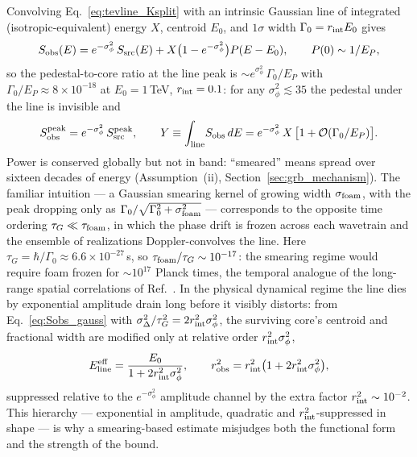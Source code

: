 \documentclass[aps,prd,onecolumn,amsmath,amssymb]{revtex4-2}
\begin{document}
Convolving Eq.~\eqref{eq:tevline_Ksplit} with an intrinsic Gaussian
line of integrated (isotropic-equivalent) energy $X$, centroid $E_0$,
and $1\sigma$ width $\Gamma_0=r_{\rm int}E_0$ gives
\begin{equation}
  S_{\rm obs}(E)
  = e^{-\sigma_\phi^2}\,S_{\rm src}(E)
  + X\bigl(1-e^{-\sigma_\phi^2}\bigr)P(E-E_0),
  \qquad P(0)\sim 1/E_P,
  \label{eq:tevline_conv}
\end{equation}
so the pedestal-to-core ratio at the line peak is
$\sim e^{\sigma_\phi^2}\,\Gamma_0/E_P$ with
$\Gamma_0/E_P\approx 8\times10^{-18}$ at $E_0=1$\,TeV,
$r_{\rm int}=0.1$: for any $\sigma_\phi^2\lesssim 35$ the pedestal
under the line is invisible and
\begin{equation}
  S^{\rm peak}_{\rm obs} = e^{-\sigma_\phi^2}\,S^{\rm peak}_{\rm src},
  \qquad
  Y \equiv \int_{\rm line}\! S_{\rm obs}\,dE
    = e^{-\sigma_\phi^2}\,X\,\bigl[1+\mathcal{O}(\Gamma_0/E_P)\bigr].
  \label{eq:tevline_suppression}
\end{equation}
Power is conserved globally but not in band: ``smeared'' means spread
over sixteen decades of energy (Assumption~(ii),
Section~\ref{sec:grb_mechanism}).  The familiar intuition --- a
Gaussian smearing kernel of growing width $\sigma_{\rm foam}$, with
the peak dropping only as
$\Gamma_0/\sqrt{\Gamma_0^2+\sigma_{\rm foam}^2}$ --- corresponds to
the opposite time ordering $\tau_G\ll\tau_{\rm foam}$, in which the
phase drift is frozen across each wavetrain and the ensemble of
realizations Doppler-convolves the line.  Here
$\tau_G=\hbar/\Gamma_0\approx 6.6\times10^{-27}$\,s, so
$\tau_{\rm foam}/\tau_G\sim10^{-17}$: the smearing regime would
require foam frozen for $\sim10^{17}$ Planck times, the temporal
analogue of the long-range spatial correlations of
Ref.~\cite{LeeZurekChen2024}.  In the physical dynamical regime the
line dies by exponential amplitude drain long before it visibly
distorts: from Eq.~\eqref{eq:Sobs_gauss} with
$\sigma_\Delta^2/\tau_G^2 = 2r_{\rm int}^2\sigma_\phi^2$, the
surviving core's centroid and fractional width are modified only at
relative order $r_{\rm int}^2\sigma_\phi^2$,
\begin{equation}
  E^{\rm eff}_{\rm line} = \frac{E_0}{1+2r_{\rm int}^2\sigma_\phi^2},
  \qquad
  r_{\rm obs}^2 = r_{\rm int}^2\bigl(1+2r_{\rm int}^2\sigma_\phi^2\bigr),
  \label{eq:tevline_shape}
\end{equation}
suppressed relative to the $e^{-\sigma_\phi^2}$ amplitude channel by
the extra factor $r_{\rm int}^2\sim10^{-2}$.  This hierarchy ---
exponential in amplitude, quadratic and $r_{\rm int}^2$-suppressed in
shape --- is why a smearing-based estimate misjudges both the
functional form and the strength of the bound.
\end{document}
